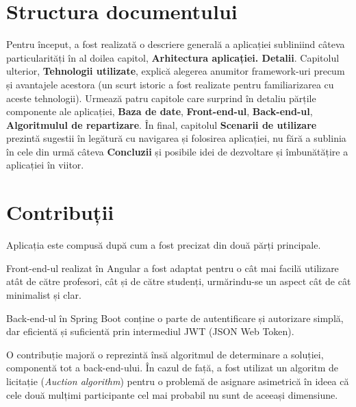\section{Structura documentului}

Pentru început, a fost realizată o descriere generală a aplicației subliniind câteva particularități în al doilea capitol, \textbf{Arhitectura aplicației. Detalii}.
Capitolul ulterior, \textbf{Tehnologii utilizate}, explică alegerea anumitor framework-uri precum și avantajele acestora (un scurt istoric a fost realizate pentru familiarizarea cu aceste tehnologii).
Urmează patru capitole care surprind în detaliu părțile componente ale aplicației, \textbf{Baza de date}, \textbf{Front-end-ul}, \textbf{Back-end-ul}, \textbf{Algoritmulul de repartizare}.
În final, capitolul \textbf{Scenarii de utilizare} prezintă sugestii în legătură cu navigarea și folosirea aplicației, nu fără a sublinia în cele din urmă câteva \textbf{Concluzii} și posibile idei de dezvoltare și îmbunătățire a aplicației în viitor.

\section{Contribuții}
Aplicația \textbf{\thesistitle} este compusă după cum a fost precizat din două părți principale.

Front-end-ul realizat în Angular a fost adaptat pentru o cât mai facilă utilizare atât de către profesori, cât și de către studenți, urmărindu-se un aspect cât de cât minimalist și clar.

Back-end-ul în Spring Boot conține o parte de autentificare și autorizare simplă, dar eficientă și suficientă prin intermediul JWT (JSON Web Token).

O contribuție majoră o reprezintă însă algoritmul de determinare a soluției, componentă tot a back-end-ului. În cazul de față, a fost utilizat un algoritm de licitație (\textit{Auction algorithm}) pentru o problemă de asignare asimetrică în ideea că cele două mulțimi participante cel mai probabil nu sunt de aceeași dimensiune.